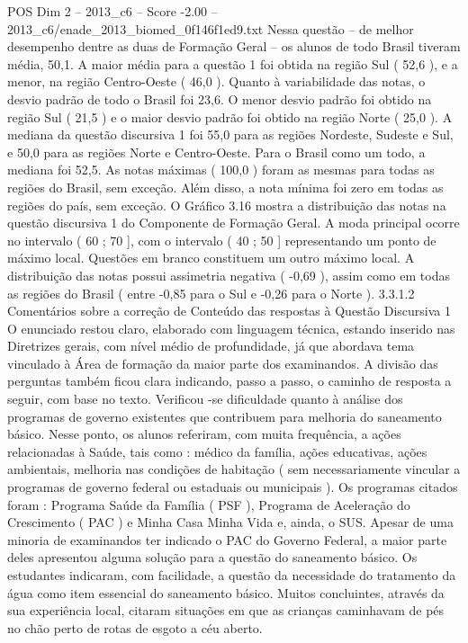 \begin{textsample}{POS Dim 2 – 2013\_c6 – Score -2.00 – 2013\_c6/enade\_2013\_biomed\_0f146f1ed9.txt}
Nessa questão – de melhor desempenho dentre as duas de Formação Geral – os alunos de todo Brasil tiveram média, 50,1.
A maior média para a questão 1 foi obtida na região Sul ( 52,6 ), e a menor, na região Centro-Oeste ( 46,0 ).
Quanto à variabilidade das notas, o desvio padrão de todo o Brasil foi 23,6.
O menor desvio padrão foi obtido na região Sul ( 21,5 ) e o maior desvio padrão foi obtido na região Norte ( 25,0 ).
A mediana da questão discursiva 1 foi 55,0 para as regiões Nordeste, Sudeste e Sul, e 50,0 para as regiões Norte e Centro-Oeste.
Para o Brasil como um todo, a mediana foi 52,5.
As notas máximas ( 100,0 ) foram as mesmas para todas as regiões do Brasil, sem exceção.
Além disso, a nota mínima foi zero em todas as regiões do país, sem exceção.
O Gráfico 3.16 mostra a distribuição das notas na questão discursiva 1 do Componente de Formação Geral.
A moda principal ocorre no intervalo ( 60 ; 70 ], com o intervalo ( 40 ; 50 ] representando um ponto de máximo local.
Questões em branco constituem um outro máximo local.
A distribuição das notas possui assimetria negativa ( -0,69 ), assim como em todas as regiões do Brasil ( entre -0,85 para o Sul e -0,26 para o Norte ). 3.3.1.2 Comentários sobre a correção de Conteúdo das respostas à Questão Discursiva 1 O enunciado restou claro, elaborado com linguagem técnica, estando inserido nas Diretrizes gerais, com nível médio de profundidade, já que abordava tema vinculado à Área de formação da maior parte dos examinandos.
A divisão das perguntas também ficou clara indicando, passo a passo, o caminho de resposta a seguir, com base no texto.
Verificou -se dificuldade quanto à análise dos programas de governo existentes que contribuem para melhoria do saneamento básico.
Nesse ponto, os alunos referiram, com muita frequência, a ações relacionadas à Saúde, tais como : médico da família, ações educativas, ações ambientais, melhoria nas condições de habitação ( sem necessariamente vincular a programas de governo federal ou estaduais ou municipais ).
Os programas citados foram : Programa Saúde da Família ( PSF ), Programa de Aceleração do Crescimento ( PAC ) e Minha Casa Minha Vida e, ainda, o SUS.
Apesar de uma minoria de examinandos ter indicado o PAC do Governo Federal, a maior parte deles apresentou alguma solução para a questão do saneamento básico.
Os estudantes indicaram, com facilidade, a questão da necessidade do tratamento da água como item essencial do saneamento básico.
Muitos concluintes, através da sua experiência local, citaram situações em que as crianças caminhavam de pés no chão perto de rotas de esgoto a céu aberto.

\end{textsample}
